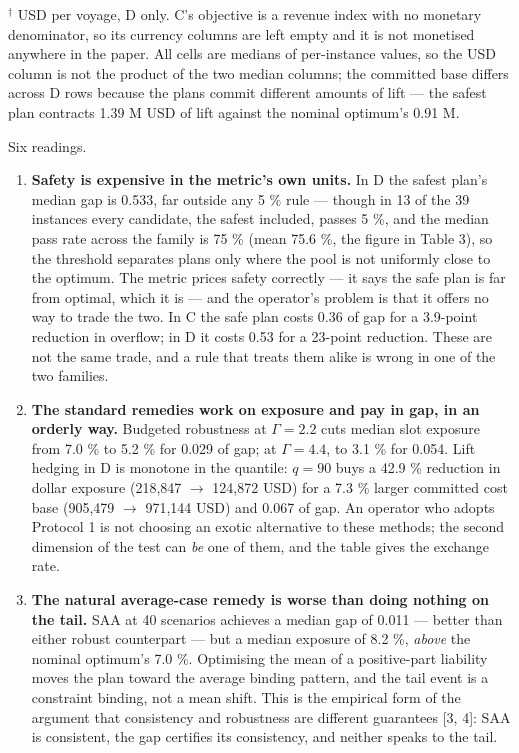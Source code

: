 \documentclass[preprint,12pt,letterpaper]{elsarticle}
\theoremstyle{definition}
\theoremstyle{plain}
\begin{document}
$^\dagger$ USD per voyage, D only. C's objective is a revenue index with no monetary denominator, so its currency columns are left empty and it is not monetised anywhere in the paper. All cells are medians of per-instance values, so the USD column is not the product of the two median columns; the committed base differs across D rows because the plans commit different amounts of lift --- the safest plan contracts 1.39 M USD of lift against the nominal optimum's 0.91 M.

Six readings.

\begin{enumerate}
\item \textbf{Safety is expensive in the metric's own units.} In D the safest plan's median gap is 0.533, far outside any 5 \% rule --- though in 13 of the 39 instances every candidate, the safest included, passes 5 \%, and the median pass rate across the family is 75 \% (mean 75.6 \%, the figure in Table 3), so the threshold separates plans only where the pool is not uniformly close to the optimum. The metric prices safety correctly --- it says the safe plan is far from optimal, which it is --- and the operator's problem is that it offers no way to trade the two. In C the safe plan costs 0.36 of gap for a 3.9-point reduction in overflow; in D it costs 0.53 for a 23-point reduction. These are not the same trade, and a rule that treats them alike is wrong in one of the two families.
\item \textbf{The standard remedies work on exposure and pay in gap, in an orderly way.} Budgeted robustness at $\Gamma = 2.2$ cuts median slot exposure from 7.0 \% to 5.2 \% for 0.029 of gap; at $\Gamma = 4.4$, to 3.1 \% for 0.054. Lift hedging in D is monotone in the quantile: $q = 90$ buys a 42.9 \% reduction in dollar exposure (218,847 $\to$ 124,872 USD) for a 7.3 \% larger committed cost base (905,479 $\to$ 971,144 USD) and 0.067 of gap. An operator who adopts Protocol 1 is not choosing an exotic alternative to these methods; the second dimension of the test can \textit{be} one of them, and the table gives the exchange rate.
\item \textbf{The natural average-case remedy is worse than doing nothing on the tail.} SAA at 40 scenarios achieves a median gap of 0.011 --- better than either robust counterpart --- but a median exposure of 8.2 \%, \textit{above} the nominal optimum's 7.0 \%. Optimising the mean of a positive-part liability moves the plan toward the average binding pattern, and the tail event is a constraint binding, not a mean shift. This is the empirical form of the argument that consistency and robustness are different guarantees [3, 4]: SAA is consistent, the gap certifies its consistency, and neither speaks to the tail.

\end{enumerate}
\end{document}
